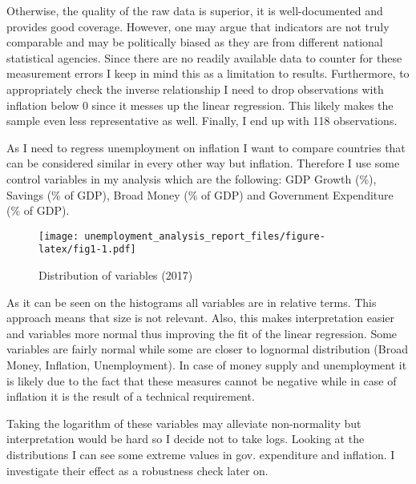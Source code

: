 \documentclass[
]{article}
\begin{document}
Otherwise, the quality of the raw data is superior, it is
well-documented and provides good coverage. However, one may argue that
indicators are not truly comparable and may be politically biased as
they are from different national statistical agencies. Since there are
no readily available data to counter for these measurement errors I keep
in mind this as a limitation to results. Furthermore, to appropriately
check the inverse relationship I need to drop observations with
inflation below 0 since it messes up the linear regression. This likely
makes the sample even less representative as well. Finally, I end up
with 118 observations.

As I need to regress unemployment on inflation I want to compare
countries that can be considered similar in every other way but
inflation. Therefore I use some control variables in my analysis which
are the following: GDP Growth (\%), Savings (\% of GDP), Broad Money (\%
of GDP) and Government Expenditure (\% of GDP).

\begin{figure}
\centering
\texttt{[image: unemployment\_analysis\_report\_files/figure-latex/fig1-1.pdf]}
\caption{Distribution of variables (2017)}
\end{figure}

As it can be seen on the histograms all variables are in relative terms.
This approach means that size is not relevant. Also, this makes
interpretation easier and variables more normal thus improving the fit
of the linear regression. Some variables are fairly normal while some
are closer to lognormal distribution (Broad Money, Inflation,
Unemployment). In case of money supply and unemployment it is likely due
to the fact that these measures cannot be negative while in case of
inflation it is the result of a technical requirement.

Taking the logarithm of these variables may alleviate non-normality but
interpretation would be hard so I decide not to take logs. Looking at
the distributions I can see some extreme values in gov. expenditure and
inflation. I investigate their effect as a robustness check later on.
\end{document}
